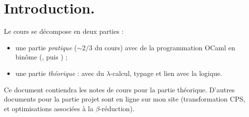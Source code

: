 \documentclass[./main]{subfiles}
\begin{document}
  \chapter*{Introduction.}

  Le cours se décompose en deux parties :
  \begin{itemize}
    \item une partie \textit{pratique} ($\sim 2/3$ du cours) avec de la programmation OCaml en binôme (\fouine, puis \pieuvre) ;
    \item une partie \textit{théorique} : avec du $\lambda$-calcul, typage et lien avec la logique.
  \end{itemize}

  Ce document contiendra les notes de cours pour la partie théorique.
  D'autres documents pour la partie projet sont en ligne sur mon site (transformation CPS, et optimisations associées à la $\beta$-réduction).
\end{document}
